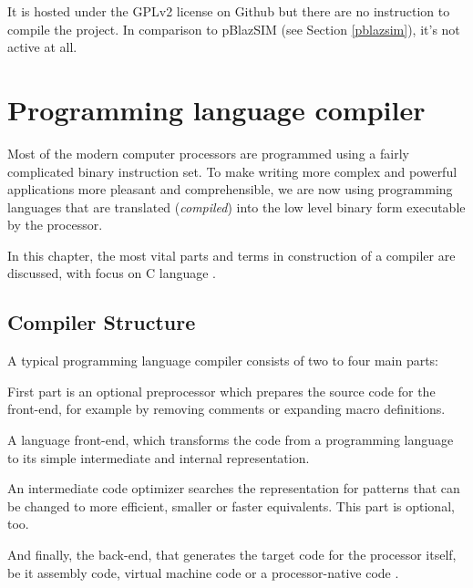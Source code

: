         It is hosted under the GPLv2 license on Github \cite{PbsimRepo} but there are no instruction to compile the project. In comparison to pBlazSIM (see Section \ref{pblazsim}), it's not active at all.

\chapter{Programming language compiler}\label{theory}

Most of the modern computer processors are programmed using a fairly complicated binary instruction set. To make writing more complex and powerful applications more pleasant and comprehensible, we are now using programming languages that are translated (\emph{compiled}) into the low level binary form executable by the processor.

In this chapter, the most vital parts and terms in construction of a compiler are discussed, with focus on C language \cite{DragonBook}.

    \section{Compiler Structure}

    A typical programming language compiler consists of two to four main parts:

    First part is an optional preprocessor which prepares the source code for the front-end, for example by removing comments or expanding macro definitions.

    A language front-end, which transforms the code from a programming language to its simple intermediate and internal representation.

    An intermediate code optimizer searches the representation for patterns that can be changed to more efficient, smaller or faster equivalents. This part is optional, too.

    And finally, the back-end, that generates the target code for the processor itself, be it assembly code, virtual machine code or a processor-native code \cite{DragonBook}.


